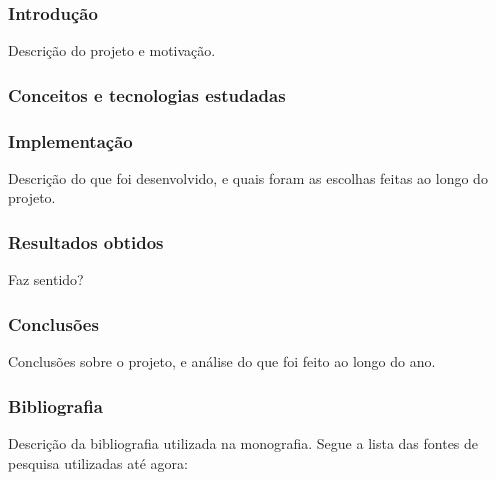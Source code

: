 \documentclass[titlepage]{article}
\begin{document}
\subsubsection{Introdução}
Descrição do projeto e motivação.

\subsubsection{Conceitos e tecnologias estudadas}

\subsubsection{Implementação}
Descrição do que foi desenvolvido, e quais foram as escolhas feitas ao longo do projeto.

\subsubsection{Resultados obtidos}
Faz sentido?

\subsubsection{Conclusões}
Conclusões sobre o projeto, e análise do que foi feito ao longo do ano.

\subsubsection{Bibliografia}
Descrição da bibliografia utilizada na monografia. Segue a lista das fontes de pesquisa utilizadas até agora:
\end{document}
